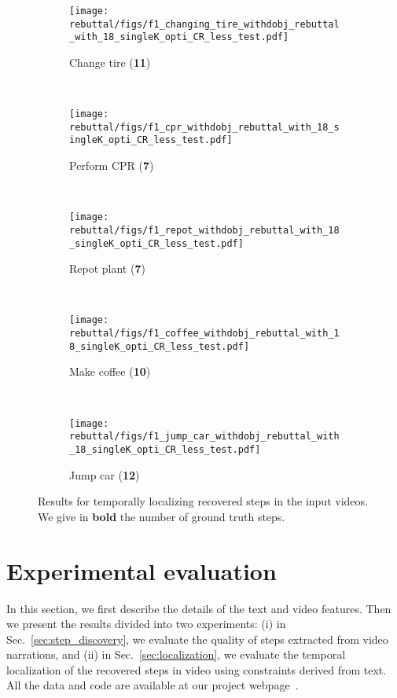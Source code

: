 \documentclass[10pt,twocolumn,letterpaper]{article}
\begin{document}
\begin{figure*}[t!]
    \centering
    \begin{subfigure}[t]{0.19\linewidth}
        \centering
        \texttt{[image: rebuttal/figs/f1\_changing\_tire\_withdobj\_rebuttal\_with\_18\_singleK\_opti\_CR\_less\_test.pdf]}
        \caption{Change tire (\textbf{11})}
    \end{subfigure}~ 
    \begin{subfigure}[t]{0.19\linewidth}
        \centering
        \texttt{[image: rebuttal/figs/f1\_cpr\_withdobj\_rebuttal\_with\_18\_singleK\_opti\_CR\_less\_test.pdf]}
        \caption{Perform CPR (\textbf{7})}
    \end{subfigure}~
	\begin{subfigure}[t]{0.19\linewidth}
        \centering
        \texttt{[image: rebuttal/figs/f1\_repot\_withdobj\_rebuttal\_with\_18\_singleK\_opti\_CR\_less\_test.pdf]}
        \caption{Repot plant (\textbf{7})}
    \end{subfigure}~
    \begin{subfigure}[t]{0.19\linewidth}
        \centering
        \texttt{[image: rebuttal/figs/f1\_coffee\_withdobj\_rebuttal\_with\_18\_singleK\_opti\_CR\_less\_test.pdf]}
        \caption{Make coffee (\textbf{10})}
    \end{subfigure}~
    \begin{subfigure}[t]{0.19\linewidth}
        \centering
        \texttt{[image: rebuttal/figs/f1\_jump\_car\_withdobj\_rebuttal\_with\_18\_singleK\_opti\_CR\_less\_test.pdf]}
        \caption{ Jump car (\textbf{12})}
    \end{subfigure}\vspace{-1mm}
    \caption{\small Results for temporally localizing recovered steps in the input videos.
    We give in \textbf{bold} the number of ground truth steps.   
}
    \vspace{-3mm}
    \label{tab:exp-localization}
\end{figure*}


\section{Experimental evaluation}
\setlength{\tabcolsep}{6pt}
\label{sec:experiments}
In this section, we first describe the details of the text and video features. 
Then we present the results divided into two experiments:
(i) in Sec.~\ref{sec:step_discovery}, we evaluate the quality of steps extracted from video narrations, and
(ii) in Sec.~\ref{sec:localization}, we evaluate the temporal localization of the recovered steps in video using constraints derived from text. 
All the data and code are available at our project webpage~\cite{Alayrac15UnsupervisedWeb}.
\end{document}
